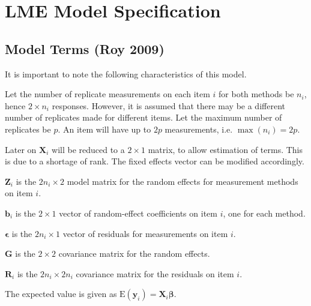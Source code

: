 \documentclass[12pt, a4paper]{report}
\theoremstyle{plain}
\theoremstyle{definition}
\theoremstyle{remark}
\begin{document}
\chapter{LME Model Specification}

\section{Model Terms (Roy 2009)}
It is important to note the following characteristics of this model.

Let the number of replicate measurements on each item $i$ for both methods be $n_i$, hence $2 \times n_i$ responses. However, it is assumed that there may be a different number of replicates made for different items. Let the maximum number of replicates be $p$. An item will have up to $2p$ measurements, i.e. $\max(n_{i}) = 2p$.


Later on $\boldsymbol{X}_i$ will be reduced to a $2 \times 1$ matrix, to allow estimation of terms. This is due to a shortage of rank. The fixed effects vector can be modified accordingly.

$\boldsymbol{Z}_i$ is the $2n_i \times  2$ model matrix for the random effects for measurement methods on item $i$.\\
\bigskip

$\boldsymbol{b}_i$ is the $2 \times  1$ vector of random-effect coefficients on item $i$, one for each method.

$\boldsymbol{\epsilon}$  is the $2n_i \times  1$ vector of residuals for measurements on item $i$.\\
\bigskip

$\boldsymbol{G}$ is the $2 \times  2$ covariance matrix for the random effects.

$\boldsymbol{R}_i$ is the $2n_i \times  2n_i$ covariance matrix for the residuals on item $i$.

The expected value is given as $\mbox{E}(\boldsymbol{y}_i) = \boldsymbol{X}_i\boldsymbol{\beta}.$ \citep{hamlett}\\
\bigskip
\end{document}
